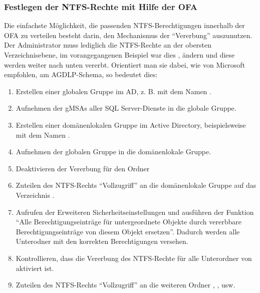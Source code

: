         \subsubsection{Festlegen der NTFS-Rechte mit Hilfe der OFA}
          Die einfachste Möglichkeit, die passenden NTFS-Berechtigungen
          innerhalb der OFA zu verteilen besteht darin, den Mechanismus der
          \enquote{Vererbung} auszunutzen. Der Administrator muss lediglich die
          NTFS-Rechte an der obersten Verzeichnisebene, im vorangegangenen
          Beispiel war dies , ändern und diese werden weiter
          nach unten vererbt. Orientiert man sie dabei, wie von Microsoft
          empfohlen, am AGDLP-Schema, so bedeutet dies:
          \begin{enumerate}
            \item Erstellen einer globalen Gruppe im AD, z. B. mit dem Namen
            .
            \item Aufnehmen der gMSAs aller SQL Server-Dienste in die globale
            Gruppe.
            \item Erstellen einer domänenlokalen Gruppe im Active Directory,
            beispielsweise mit dem Namen .
            \item Aufnehmen der globalen Gruppe in die domänenlokale Gruppe.
            \item Deaktivieren der Vererbung für den Ordner
            \item Zuteilen des NTFS-Rechts \enquote{Vollzugriff} an die
            domänenlokale Gruppe auf das Verzeichnis .
            \item Aufrufen der Erweiteren Sicherheitseinstellungen und
            ausführen der Funktion \enquote{Alle Berechtigungseinträge für
            untergeordnete Objekte durch vererbbare Berechtigungseinträge von
            diesem Objekt ersetzen}. Dadurch werden alle Unterodner mit den
            korrekten Berechtigungen versehen.
            \item Kontrollieren, dass die Vererbung des NTFS-Rechte für alle
            Unterordner von  aktiviert ist.
            \item Zuteilen des NTFS-Rechts \enquote{Vollzugriff} an die weiteren
            Ordner , , usw.
          \end{enumerate}    
